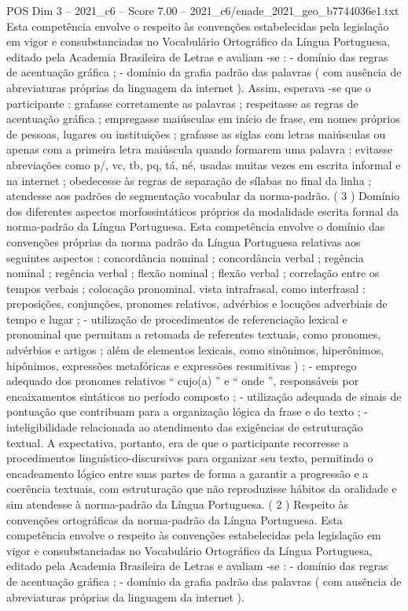 \begin{textsample}{POS Dim 3 – 2021\_c6 – Score 7.00 – 2021\_c6/enade\_2021\_geo\_b7744036e1.txt}
Esta competência envolve o respeito às convenções estabelecidas pela legislação em vigor e consubstanciadas no Vocabulário Ortográfico da Língua Portuguesa, editado pela Academia Brasileira de Letras e avaliam -se : - domínio das regras de acentuação gráfica ; - domínio da grafia padrão das palavras ( com ausência de abreviaturas próprias da linguagem da internet ).
Assim, esperava -se que o participante : grafasse corretamente as palavras ; respeitasse as regras de acentuação gráfica ; empregasse maiúsculas em início de frase, em nomes próprios de pessoas, lugares ou instituições ; grafasse as siglas com letras maiúsculas ou apenas com a primeira letra maiúscula quando formarem uma palavra ; evitasse abreviações como p/, vc, tb, pq, tá, né, usadas muitas vezes em escrita informal e na internet ; obedecesse às regras de separação de sílabas no final da linha ; atendesse aos padrões de segmentação vocabular da norma-padrão. ( 3 ) Domínio dos diferentes aspectos morfossintáticos próprios da modalidade escrita formal da norma-padrão da Língua Portuguesa.
Esta competência envolve o domínio das convenções próprias da norma padrão da Língua Portuguesa relativas aos seguintes aspectos : concordância nominal ; concordância verbal ; regência nominal ; regência verbal ; flexão nominal ; flexão verbal ; correlação entre os tempos verbais ; colocação pronominal. vista intrafrasal, como interfrasal : preposições, conjunções, pronomes relativos, advérbios e locuções adverbiais de tempo e lugar ; - utilização de procedimentos de referenciação lexical e pronominal que permitam a retomada de referentes textuais, como pronomes, advérbios e artigos ; além de elementos lexicais, como sinônimos, hiperônimos, hipônimos, expressões metafóricas e expressões resumitivas ) ; - emprego adequado dos pronomes relativos “ cujo(a) ” e “ onde ”, responsáveis por encaixamentos sintáticos no período composto ; - utilização adequada de sinais de pontuação que contribuam para a organização lógica da frase e do texto ; - inteligibilidade relacionada ao atendimento das exigências de estruturação textual.
A expectativa, portanto, era de que o participante recorresse a procedimentos linguístico-discursivos para organizar seu texto, permitindo o encadeamento lógico entre suas partes de forma a garantir a progressão e a coerência textuais, com estruturação que não reproduzisse hábitos da oralidade e sim atendesse à norma-padrão da Língua Portuguesa. ( 2 ) Respeito às convenções ortográficas da norma-padrão da Língua Portuguesa.
Esta competência envolve o respeito às convenções estabelecidas pela legislação em vigor e consubstanciadas no Vocabulário Ortográfico da Língua Portuguesa, editado pela Academia Brasileira de Letras e avaliam -se : - domínio das regras de acentuação gráfica ; - domínio da grafia padrão das palavras ( com ausência de abreviaturas próprias da linguagem da internet ).

\end{textsample}
